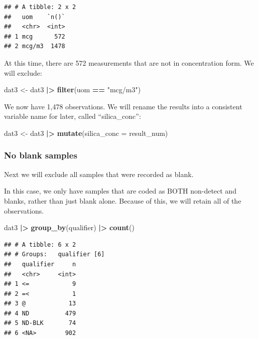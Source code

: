 \documentclass[
]{article}
\newenvironment{Shaded}{\begin{snugshade}}{\end{snugshade}}
\newcommand{\AttributeTok}[1]{\textcolor[rgb]{0.13,0.29,0.53}{#1}}
\newcommand{\FunctionTok}[1]{\textcolor[rgb]{0.13,0.29,0.53}{\textbf{#1}}}
\newcommand{\NormalTok}[1]{#1}
\newcommand{\OtherTok}[1]{\textcolor[rgb]{0.56,0.35,0.01}{#1}}
\newcommand{\SpecialCharTok}[1]{\textcolor[rgb]{0.81,0.36,0.00}{\textbf{#1}}}
\newcommand{\StringTok}[1]{\textcolor[rgb]{0.31,0.60,0.02}{#1}}
\begin{document}
\begin{verbatim}
## # A tibble: 2 x 2
##   uom    `n()`
##   <chr>  <int>
## 1 mcg      572
## 2 mcg/m3  1478
\end{verbatim}

At this time, there are 572 measurements that are not in concentration
form. We will exclude:

\begin{Shaded}
\begin{Highlighting}[]
\NormalTok{dat3 }\OtherTok{\textless{}{-}}\NormalTok{ dat3 }\SpecialCharTok{|\textgreater{}} 
  \FunctionTok{filter}\NormalTok{(uom }\SpecialCharTok{==} \StringTok{"mcg/m3"}\NormalTok{)}
\end{Highlighting}
\end{Shaded}

We now have 1,478 observations. We will rename the results into a
consistent variable name for later, called ``silica\_conc'':

\begin{Shaded}
\begin{Highlighting}[]
\NormalTok{dat3 }\OtherTok{\textless{}{-}}\NormalTok{ dat3 }\SpecialCharTok{|\textgreater{}} 
  \FunctionTok{mutate}\NormalTok{(}\AttributeTok{silica\_conc =}\NormalTok{ result\_num)}
\end{Highlighting}
\end{Shaded}

\subsubsection{No blank samples}\label{no-blank-samples}

Next we will exclude all samples that were recorded as blank.

In this case, we only have samples that are coded as BOTH non-detect and
blanks, rather than just blank alone. Because of this, we will retain
all of the observations.

\begin{Shaded}
\begin{Highlighting}[]
\NormalTok{dat3 }\SpecialCharTok{|\textgreater{}} 
  \FunctionTok{group\_by}\NormalTok{(qualifier) }\SpecialCharTok{|\textgreater{}} 
  \FunctionTok{count}\NormalTok{()  }
\end{Highlighting}
\end{Shaded}

\begin{verbatim}
## # A tibble: 6 x 2
## # Groups:   qualifier [6]
##   qualifier     n
##   <chr>     <int>
## 1 <=            9
## 2 =<            1
## 3 @            13
## 4 ND          479
## 5 ND-BLK       74
## 6 <NA>        902
\end{verbatim}
\end{document}
